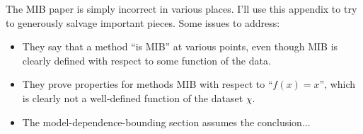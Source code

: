 \documentclass{article}
\begin{document}
The MIB paper is simply incorrect in various places.
I'll use this appendix to try to generously salvage important pieces.
Some issues to address:
\begin{itemize}
    \item They say that a method ``is MIB'' at various points, even though MIB is clearly defined with respect to some function of the data.
    \item They prove properties for methods MIB with respect to ``$f(x)=x$'', which is clearly not a well-defined function of the dataset $\chi$.
    \item The model-dependence-bounding section assumes the conclusion...
\end{itemize}


\end{document}
